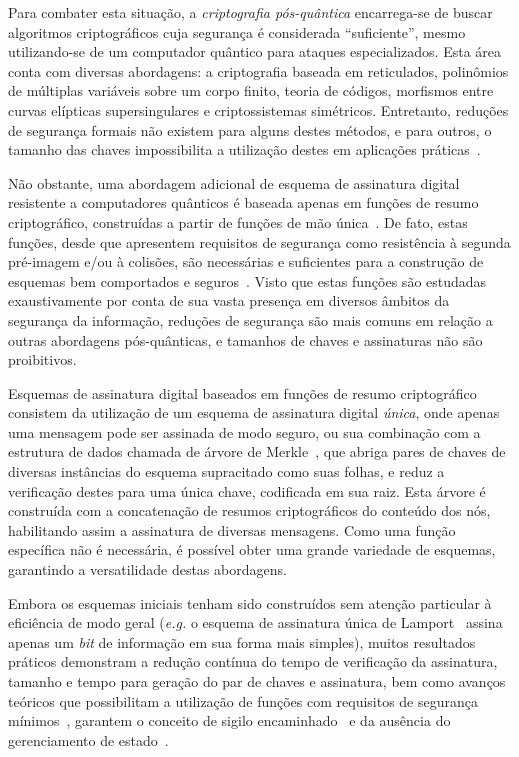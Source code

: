 \documentclass[12pt,notitlepage]{report}
\begin{document}
Para combater esta situação, a \emph{criptografia pós-quântica} encarrega-se de
buscar algoritmos criptográficos cuja segurança é considerada ``suficiente'',
mesmo utilizando-se de um computador quântico para ataques especializados. Esta
área conta com diversas abordagens: a criptografia baseada em reticulados,
polinômios de múltiplas variáveis sobre um corpo finito, teoria de códigos,
morfismos entre curvas elípticas supersingulares e criptossistemas simétricos.
Entretanto, reduções de segurança formais não existem para alguns destes
métodos, e para outros, o tamanho das chaves impossibilita a utilização destes
em aplicações práticas~\cite{Bernstein2017}.

Não obstante, uma abordagem adicional de esquema de assinatura digital
resistente a computadores quânticos é baseada apenas em funções de
resumo criptográfico, construídas a partir de funções de mão
única~\cite{cryptoeprint:2005:328}. De fato, estas funções, desde que
apresentem requisitos de segurança como resistência à segunda pré-imagem e/ou
à colisões, são necessárias e suficientes para a construção de esquemas bem
comportados e seguros~\cite{Rompel:1990:OFN:100216.100269}. Visto que estas
funções são estudadas exaustivamente por conta de sua vasta presença em
diversos âmbitos da segurança da informação, reduções de segurança são mais
comuns em relação a outras abordagens pós-quânticas, e tamanhos de chaves e
assinaturas não são proibitivos.

Esquemas de assinatura digital baseados em funções de resumo criptográfico
consistem da utilização de um esquema de assinatura digital \emph{única}, onde
apenas uma mensagem pode ser assinada de modo seguro, ou sua combinação com a
estrutura de dados chamada de árvore de Merkle~\cite{Merkle:1989:CDS:118209.118230},
que abriga pares de chaves de diversas instâncias
do esquema supracitado como suas folhas, e reduz a verificação destes para uma
única chave, codificada em sua raiz. Esta árvore é construída com a
concatenação de resumos criptográficos do conteúdo dos nós, habilitando assim a
assinatura de diversas mensagens. Como uma função específica não é necessária,
é possível obter uma grande variedade de esquemas, garantindo a versatilidade
destas abordagens.

Embora os esquemas iniciais tenham sido construídos sem atenção particular à
eficiência de modo geral (\emph{e.g.} o esquema de assinatura única de
Lamport~\cite{lamport1979constructing} assina apenas um \emph{bit}
de informação em sua forma mais simples), muitos resultados práticos demonstram
a redução contínua do tempo de verificação da assinatura, tamanho e tempo para
geração do par de chaves e assinatura, bem como avanços teóricos que
possibilitam a utilização de funções com requisitos de segurança
mínimos~\cite{Hlsing2013}, garantem o conceito de sigilo
encaminhado~\cite{Buchmann:2011:XPF:2184003.2184011}
e da ausência do gerenciamento de estado~\cite{Bernstein2015}.
\end{document}
